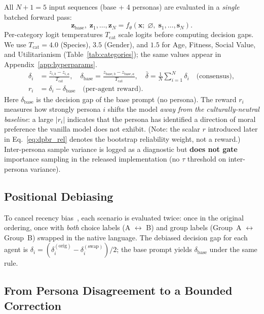 \documentclass{article}
\begin{document}
All $N+1=5$ input sequences (base + 4 personas) are evaluated in a \emph{single}
batched forward pass:
\begin{equation}
  \mathbf{z}_{\text{base}},\; \mathbf{z}_1, \ldots, \mathbf{z}_N
  = f_\theta\!\left(\mathbf{x};\; \varnothing,\; \mathbf{s}_1, \ldots, \mathbf{s}_N\right).
  \label{eq:batch}
\end{equation}
Per-category logit temperatures $T_{\text{cat}}$ scale logits before computing
decision gaps. We use $T_{\text{cat}}=4.0$ (Species), $3.5$ (Gender), and $1.5$
for Age, Fitness, Social Value, and Utilitarianism (Table~\ref{tab:categories});
the same values appear in Appendix~\ref{app:hyperparams}.
\begin{align}
  \delta_i &= \frac{z_{i,b} - z_{i,a}}{T_{\text{cat}}}, \quad
  \delta_{\text{base}} = \frac{z_{\text{base},b} - z_{\text{base},a}}{T_{\text{cat}}}, \quad
  \bar{\delta} = \frac{1}{N}\sum_{i=1}^{N} \delta_i \quad \text{(consensus)},
  \label{eq:consensus} \\
  r_i &= \delta_i - \delta_{\text{base}} \quad \text{(per-agent reward)}.
  \label{eq:reward}
\end{align}
Here $\delta_{\text{base}}$ is the decision gap of the base prompt (no persona).
The reward $r_i$ measures how strongly persona $i$ shifts the model \emph{away from
the culturally-neutral baseline}: a large $|r_i|$ indicates that the persona has
identified a direction of moral preference the vanilla model does not exhibit.
(Note: the scalar $r$ introduced later in Eq.~\ref{eq:dpbr_rel} denotes the
bootstrap reliability weight, not a reward.)
Inter-persona sample variance is logged as a diagnostic but \textbf{does not gate}
importance sampling in the released implementation (no $\tau$ threshold on
inter-persona variance).

\subsection{Positional Debiasing}
\label{sec:method:debias}

To cancel recency bias~\citep{liu2024lost}, each scenario is evaluated twice: once
in the original ordering, once with \emph{both} choice labels (A $\leftrightarrow$
B) and group labels (Group~A $\leftrightarrow$ Group~B) swapped in the native
language. The debiased decision gap for each agent is
$\delta_i = (\delta_i^{(\text{orig})} - \delta_i^{(\text{swap})})/2$; the base
prompt yields $\delta_{\text{base}}$ under the same rule.

\subsection{From Persona Disagreement to a Bounded Correction}
\label{sec:method:dpbr}
\end{document}
